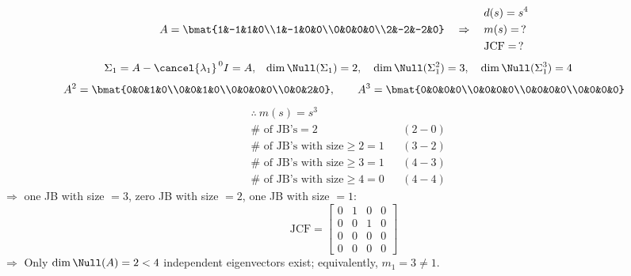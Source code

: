 \begin{example}
\leavevmode{}\[
A=\bmat{1&-1&1&0\\1&-1&0&0\\0&0&0&0\\2&-2&-2&0}
\quad\Rightarrow\quad
\begin{aligned}
&d(s)=s^4\\
&m(s)=\,?\\
&\text{JCF}=\,?
\end{aligned}
\]
\begin{align*}
\Sigma_1&=A-\cancel{\lambda_1}^{\,0}I=A, &
\dim\Null(\Sigma_1)&=2, \quad \dim\Null(\Sigma_1^2)=3, \quad \dim\Null(\Sigma_1^3)=4
\end{align*}
\[
A^2=\bmat{0&0&1&0\\0&0&1&0\\0&0&0&0\\0&0&2&0},\qquad
A^3=\bmat{0&0&0&0\\0&0&0&0\\0&0&0&0\\0&0&0&0}
\]
\begin{align*}
&\therefore\ m(s)=s^3\\
&\#\text{ of JB's}=2 &&(2-0)\\
&\#\text{ of JB's with size}\ge2=1 &&(3-2)\\
&\#\text{ of JB's with size}\ge3=1 &&(4-3)\\
&\#\text{ of JB's with size}\ge4=0 &&(4-4)
\end{align*}
$\Rightarrow$ one JB with size $=3$, zero JB with size $=2$, one JB with size $=1$:
\[
\text{JCF}=\left[\begin{array}{ccc|c}0&1&0&0\\0&0&1&0\\0&0&0&0\\\hline0&0&0&0\end{array}\right]
\]
$\Rightarrow$  Only $\dim\Null(A)=2<4$ independent eigenvectors exist; equivalently, $m_1=3\neq1$.
\end{example}

